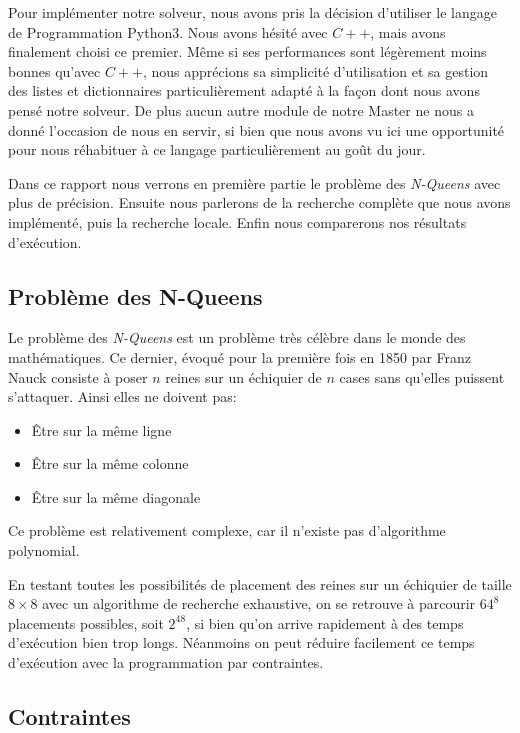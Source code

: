 \documentclass{article}
\begin{document}
Pour implémenter notre solveur, nous avons pris la décision d'utiliser le langage de Programmation Python3. Nous avons hésité avec $C++$, mais avons finalement choisi ce premier. Même si ses performances sont légèrement moins bonnes qu'avec $C++$, nous apprécions sa simplicité d’utilisation et sa gestion des listes et dictionnaires particulièrement adapté à la façon dont nous avons pensé notre solveur. De plus aucun autre module de notre Master ne nous a donné l’occasion de nous en servir, si bien que nous avons vu ici une opportunité pour nous réhabituer à ce langage particulièrement au goût du jour.

Dans ce rapport nous verrons en première partie le problème des \emph{N-Queens} avec plus de précision. Ensuite nous parlerons de la recherche complète que nous avons implémenté, puis la recherche locale. Enfin nous comparerons nos résultats d'exécution. 


\vspace{1cm}

\subsection{Problème des N-Queens}

Le problème des \emph{N-Queens} est un problème très célèbre dans le monde des mathématiques. Ce dernier, évoqué pour la première fois en 1850 par Franz Nauck consiste à poser $n$ reines sur un échiquier de $n$ cases sans qu'elles puissent s'attaquer. Ainsi elles ne doivent pas: 
\begin{itemize}
\item Être sur la même ligne
\item Être sur la même colonne
\item Être sur la même diagonale
\end{itemize}

Ce problème est relativement complexe, car il n'existe pas d'algorithme polynomial.


En testant toutes les possibilités de placement des reines sur un échiquier de taille $8\times8$ avec un algorithme de recherche exhaustive, on se retrouve à parcourir $64^8$ placements possibles, soit $2^{48}$, si bien qu'on arrive rapidement à des temps d'exécution bien trop longs. Néanmoins on peut réduire facilement ce temps d'exécution avec la programmation par contraintes. 


\subsection{Contraintes}
\end{document}
